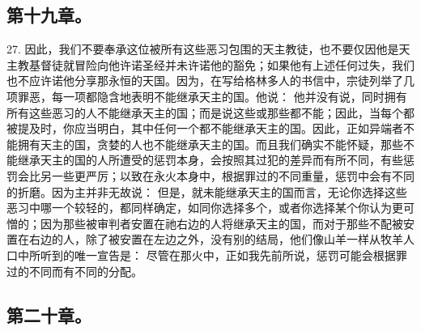
\subsection{第十九章。}

27. 因此，我们不要奉承这位被所有这些恶习包围的天主教徒，也不要仅因他是天主教基督徒就冒险向他许诺圣经并未许诺他的豁免；如果他有上述任何过失，我们也不应许诺他分享那永恒的天国。因为，在写给格林多人的书信中，宗徒列举了几项罪恶，每一项都隐含地表明不能继承天主的国。他说： 他并没有说，同时拥有所有这些恶习的人不能继承天主的国；而是说这些或那些都不能；因此，当每个都被提及时，你应当明白，其中任何一个都不能继承天主的国。因此，正如异端者不能拥有天主的国，贪婪的人也不能继承天主的国。而且我们确实不能怀疑，那些不能继承天主的国的人所遭受的惩罚本身，会按照其过犯的差异而有所不同，有些惩罚会比另一些更严厉；以致在永火本身中，根据罪过的不同重量，惩罚中会有不同的折磨。因为主并非无故说： 但是，就未能继承天主的国而言，无论你选择这些恶习中哪一个较轻的，都同样确定，如同你选择多个，或者你选择某个你认为更可憎的；因为那些被审判者安置在祂右边的人将继承天主的国，而对于那些不配被安置在右边的人，除了被安置在左边之外，没有别的结局，他们像山羊一样从牧羊人口中所听到的唯一宣告是： 尽管在那火中，正如我先前所说，惩罚可能会根据罪过的不同而有不同的分配。\par


\subsection{第二十章。}

